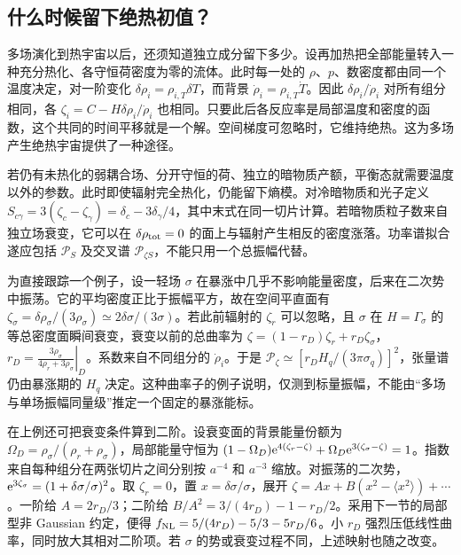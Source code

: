 \subsection{什么时候留下绝热初值？}\label{sec:cosmo-inf-adiabatic-end}

多场演化到热宇宙以后，还须知道独立成分留下多少。设再加热把全部能量转入一种充分热化、各守恒荷密度为零的流体。此时每一处的 $\rho$、$p$、数密度都由同一个温度决定，对一阶变化 $\delta\rho_i=\rho_{i,T}\delta T$，而背景 $\dot\rho_i=\rho_{i,T}\dot T$。因此 $\delta\rho_i/\dot\rho_i$ 对所有组分相同，各 $\zeta_i=C-H\delta\rho_i/\dot\rho_i$ 也相同。只要此后各反应率是局部温度和密度的函数，这个共同的时间平移就是一个解。空间梯度可忽略时，它维持绝热。这为多场产生绝热宇宙提供了一种途径。

若仍有未热化的弱耦合场、分开守恒的荷、独立的暗物质产额，平衡态就需要温度以外的参数。此时即使辐射完全热化，仍能留下熵模。对冷暗物质和光子定义 $S_{c\gamma}=3(\zeta_c-\zeta_\gamma)=\delta_c-3\delta_\gamma/4$，其中末式在同一切片计算。若暗物质粒子数来自独立场衰变，它可以在 $\delta\rho_{\rm tot}=0$ 的面上与辐射产生相反的密度涨落。功率谱拟合遂应包括 $\mathcal P_S$ 及交叉谱 $\mathcal P_{\zeta S}$，不能只用一个总振幅代替。

为直接跟踪一个例子，设一轻场 $\sigma$ 在暴涨中几乎不影响能量密度，后来在二次势中振荡。它的平均密度正比于振幅平方，故在空间平直面有 $\zeta_\sigma=\delta\rho_\sigma/(3\rho_\sigma)\simeq2\delta\sigma/(3\sigma)$。若此前辐射的 $\zeta_r$ 可以忽略，且 $\sigma$ 在 $H=\Gamma_\sigma$ 的等总密度面瞬间衰变，衰变以前的总曲率为 $\zeta=(1-r_D)\zeta_r+r_D\zeta_\sigma$，$r_D=\left.\frac{3\rho_\sigma}{4\rho_r+3\rho_\sigma}\right|_D$。系数来自不同组分的 $\dot\rho_i$。于是 $\mathcal P_\zeta\simeq[r_DH_q/(3\pi\sigma_q)]^2$，张量谱仍由暴涨期的 $H_q$ 决定。这种曲率子的例子说明，仅测到标量振幅，不能由“多场与单场振幅同量级”推定一个固定的暴涨能标。

在上例还可把衰变条件算到二阶。设衰变面的背景能量份额为 $\Omega_D=\rho_\sigma/(\rho_r+\rho_\sigma)$，局部能量守恒为 $(1-\Omega_D)\mathrm{e}^{4(\zeta_r-\zeta)} +\Omega_D\mathrm{e}^{3(\zeta_\sigma-\zeta)}=1$。指数来自每种组分在两张切片之间分别按 $a^{-4}$ 和 $a^{-3}$ 缩放。对振荡的二次势，$\mathrm{e}^{3\zeta_\sigma}=(1+\delta\sigma/\sigma)^2$。取 $\zeta_r=0$，置 $x=\delta\sigma/\sigma$，展开 $\zeta=A x+B(x^2-\langle x^2\rangle)+\cdots$。一阶给 $A=2r_D/3$；二阶给 $B/A^2=3/(4r_D)-1-r_D/2$。采用下一节的局部型非 Gaussian 约定，便得 $f_{\rm NL}=5/(4r_D)-5/3-5r_D/6$。小 $r_D$ 强烈压低线性曲率，同时放大其相对二阶项。若 $\sigma$ 的势或衰变过程不同，上述映射也随之改变。

